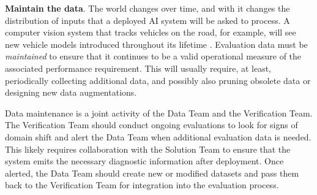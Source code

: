 \textbf{Maintain the data}. The world changes over time, and with it changes the distribution of inputs that a deployed AI system will be asked to process. A computer vision system that tracks vehicles on the road, for example, will see new vehicle models introduced throughout its lifetime \cite{dietterich_familiarity_2022}. Evaluation data must be \emph{maintained} to ensure that it continues to be a valid operational measure of the associated performance requirement. This will usually require, at least, periodically collecting additional data, and possibly also pruning obsolete data or designing new data augmentations.

Data maintenance is a joint activity of the Data Team and the Verification Team. The Verification Team should conduct ongoing evaluations to look for signs of domain shift and alert the Data Team when additional evaluation data is needed. This likely requires collaboration with the Solution Team to ensure that the system emits the necessary diagnostic information after deployment. Once alerted, the Data Team should create new or modified datasets and pass them back to the Verification Team for integration into the evaluation process. 


